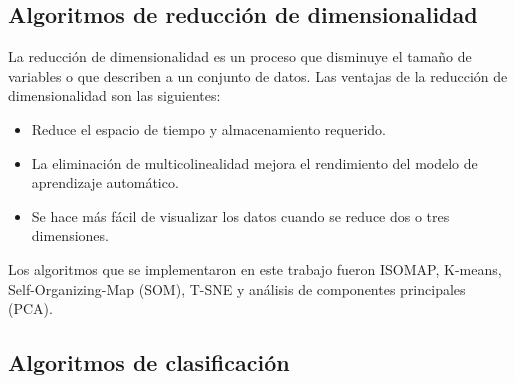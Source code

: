 \subsection{Algoritmos de reducción de dimensionalidad \label{sec:methods}}

La reducción de dimensionalidad es un proceso que disminuye el tamaño de variables o que describen a un conjunto de datos. Las ventajas de la reducción de dimensionalidad son las siguientes:

\begin{itemize}
    \item Reduce el espacio de tiempo y almacenamiento requerido.
    \item La eliminación de multicolinealidad mejora el rendimiento del modelo de aprendizaje automático.
    \item Se hace más fácil de visualizar los datos cuando se reduce dos o tres dimensiones.
\end{itemize}

Los algoritmos que se implementaron en este trabajo fueron ISOMAP, K-means, Self-Organizing-Map (SOM), T-SNE y análisis de componentes principales (PCA).








\subsection{Algoritmos de clasificación}





